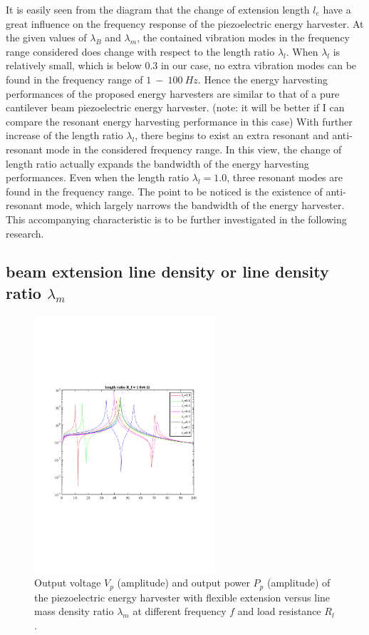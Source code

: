 \documentclass{elsarticle}
\begin{document}
It is easily seen from the diagram that the change of extension length $l_e$ have a great influence on the frequency response of the piezoelectric energy harvester. At the given values of $\lambda_B$ and $\lambda_m$, the contained vibration modes in the frequency range considered does change with respect to
the length ratio $\lambda_l$. When $\lambda_l$ is relatively small, which is below $0.3$ in our case, no extra vibration modes can be found in the frequency range of $1\ - \ 100\ Hz$. Hence the energy harvesting performances of the proposed energy harvesters are similar to that of a pure cantilever beam piezoelectric energy harvester. (note: it will be better if I can compare the resonant energy harvesting performance in this case) With further increase of the length ratio $\lambda_l$, there begins to exist an extra resonant and anti-resonant mode in the considered frequency range. In this view, the change of length ratio actually expands the bandwidth of the energy harvesting performances. Even when the length ratio $\lambda_l = 1.0$, three resonant modes are found in the frequency range. The point to be noticed is the existence of anti-resonant mode, which largely narrows the bandwidth of the energy harvester. This accompanying characteristic is to be further investigated in the following research. 



\subsection{beam extension line density or line density ratio $\lambda_m$}


\begin{figure}[!htbp]
    \centering
    \includegraphics[width=0.6\textwidth]{./fig_laml_vol_versus_fr_Rl}
    \caption{Output voltage $V_p$ (amplitude) and output power $P_p$ (amplitude) of the piezoelectric energy harvester with flexible extension versus line mass density ratio $\lambda_m$ at different frequency $f$ and load resistance $R_l$. }
    \label{fig:fig_lamm_vol_versus_fr_Rl}
\end{figure}
\end{document}
